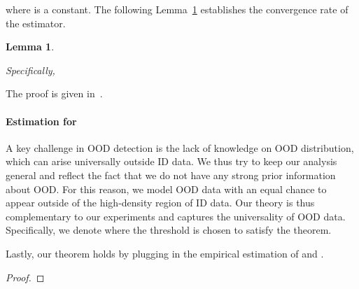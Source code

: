 \documentclass[nohyperref]{article}
\theoremstyle{plain}
\newtheorem{lemma}[theorem]{Lemma}
\theoremstyle{definition}
\theoremstyle{remark}
\begin{document}
where  is a constant. The following Lemma~\ref{lemma:l1bound} establishes the convergence rate of the estimator.

\begin{lemma}
\label{lemma:l1bound}
 
Specifically,

\end{lemma}
The proof is given in~\cite{zhao2020analysis}. 

\paragraph{Estimation for }
A key challenge in OOD detection is the lack of knowledge on OOD distribution, which can arise universally outside ID data. We thus try to keep our analysis general and reflect the fact that we do not have any strong prior information about OOD. For this reason, we model OOD data with an equal chance to appear outside of the high-density region of ID data. Our theory is thus complementary to our experiments and captures the universality of OOD data. 
Specifically, we denote 
where the threshold is chosen to satisfy the theorem. 

Lastly, our theorem holds by plugging in the empirical estimation of  and . 

\begin{proof}




\end{proof}


 
\end{document}
